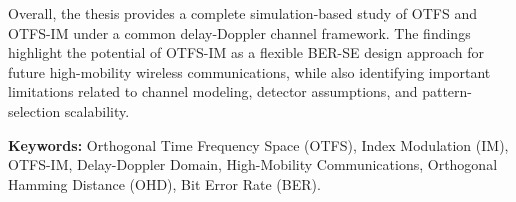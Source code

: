 Overall, the thesis provides a complete simulation-based study of OTFS and OTFS-IM under a common delay-Doppler channel framework. The findings highlight the potential of OTFS-IM as a flexible BER-SE design approach for future high-mobility wireless communications, while also identifying important limitations related to channel modeling, detector assumptions, and pattern-selection scalability.

\textbf{Keywords:} Orthogonal Time Frequency Space (OTFS), Index Modulation (IM), OTFS-IM, Delay-Doppler Domain, High-Mobility Communications, Orthogonal Hamming Distance (OHD), Bit Error Rate (BER).

\newpage
